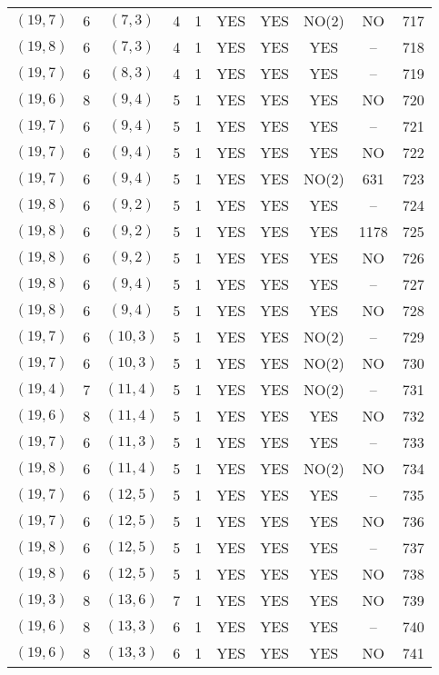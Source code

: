 \begin{longtable}{|c|c|c|c|c|c|c|c|c|c|}
$(19, 7)$ & 6 & $(7, 3)$ & 4 & 1 & YES & YES & NO(2) & NO & 717\\
$(19, 8)$ & 6 & $(7, 3)$ & 4 & 1 & YES & YES & YES & -- & 718\\
$(19, 7)$ & 6 & $(8, 3)$ & 4 & 1 & YES & YES & YES & -- & 719\\
$(19, 6)$ & 8 & $(9, 4)$ & 5 & 1 & YES & YES & YES & NO & 720\\
$(19, 7)$ & 6 & $(9, 4)$ & 5 & 1 & YES & YES & YES & -- & 721\\
$(19, 7)$ & 6 & $(9, 4)$ & 5 & 1 & YES & YES & YES & NO & 722\\
$(19, 7)$ & 6 & $(9, 4)$ & 5 & 1 & YES & YES & NO(2) & 631 & 723\\
$(19, 8)$ & 6 & $(9, 2)$ & 5 & 1 & YES & YES & YES & -- & 724\\
$(19, 8)$ & 6 & $(9, 2)$ & 5 & 1 & YES & YES & YES & 1178 & 725\\
$(19, 8)$ & 6 & $(9, 2)$ & 5 & 1 & YES & YES & YES & NO & 726\\
$(19, 8)$ & 6 & $(9, 4)$ & 5 & 1 & YES & YES & YES & -- & 727\\
$(19, 8)$ & 6 & $(9, 4)$ & 5 & 1 & YES & YES & YES & NO & 728\\
$(19, 7)$ & 6 & $(10, 3)$ & 5 & 1 & YES & YES & NO(2) & -- & 729\\
$(19, 7)$ & 6 & $(10, 3)$ & 5 & 1 & YES & YES & NO(2) & NO & 730\\
$(19, 4)$ & 7 & $(11, 4)$ & 5 & 1 & YES & YES & NO(2) & -- & 731\\
$(19, 6)$ & 8 & $(11, 4)$ & 5 & 1 & YES & YES & YES & NO & 732\\
$(19, 7)$ & 6 & $(11, 3)$ & 5 & 1 & YES & YES & YES & -- & 733\\
$(19, 8)$ & 6 & $(11, 4)$ & 5 & 1 & YES & YES & NO(2) & NO & 734\\
$(19, 7)$ & 6 & $(12, 5)$ & 5 & 1 & YES & YES & YES & -- & 735\\
$(19, 7)$ & 6 & $(12, 5)$ & 5 & 1 & YES & YES & YES & NO & 736\\
$(19, 8)$ & 6 & $(12, 5)$ & 5 & 1 & YES & YES & YES & -- & 737\\
$(19, 8)$ & 6 & $(12, 5)$ & 5 & 1 & YES & YES & YES & NO & 738\\
$(19, 3)$ & 8 & $(13, 6)$ & 7 & 1 & YES & YES & YES & NO & 739\\
$(19, 6)$ & 8 & $(13, 3)$ & 6 & 1 & YES & YES & YES & -- & 740\\
$(19, 6)$ & 8 & $(13, 3)$ & 6 & 1 & YES & YES & YES & NO & 741\\

\end{longtable}
